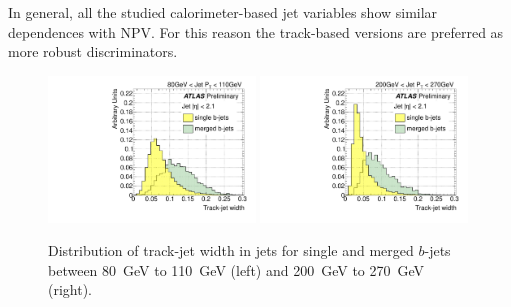  In general, all the studied calorimeter-based jet variables show similar dependences with NPV. For this reason the track-based versions are preferred as more robust discriminators.
\vspace{3 mm}
\begin{figure}[tp]
\centering
\includegraphics[width=0.49\textwidth]{FIGS/VarsSingleMerged/trkWidth080.pdf}
\includegraphics[width=0.49\textwidth]{FIGS/VarsSingleMerged/trkWidth200.pdf}
\caption{Distribution of track-jet width in jets for single and merged $b$-jets between 80~GeV to 110~GeV (left) and 200~GeV to 270~GeV (right).}
\label{fig:trkwidthsinglemerged}
\end{figure}


